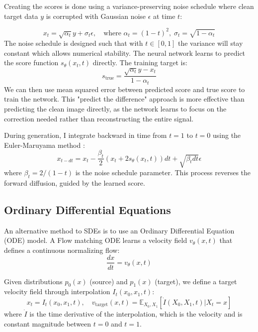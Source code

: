 \documentclass[conference,a4paper]{IEEEtran}
\begin{document}
Creating the scores is done using a variance-preserving noise schedule where clean target data $y$ is corrupted with Gaussian noise $\epsilon$ at time $t$:

\begin{equation}
    x_t = \sqrt{\alpha_t}y + \sigma_t\epsilon, \quad \text{where } \alpha_t = (1-t)^2, \; \sigma_t = \sqrt{1 - \alpha_t}
\end{equation}
The noise schedule is designed such that with $t \in [0, 1]$ the variance will stay constant which allows numerical stability. The neural network learns to predict the score function $s_\theta(x_t, t)$ directly. The training target is:
\begin{equation}
    s_{\text{true}} = \frac{\sqrt{\alpha_t}y - x_t}{1 - \alpha_t}
\end{equation}
We can then use mean squared error between predicted score and true score to train the network. This "predict the difference" approach is more effective than predicting the clean image directly, as the network learns to focus on the correction needed rather than reconstructing the entire signal.

During generation, I integrate backward in time from $t=1$ to $t=0$ using the Euler-Maruyama method \cite{burdenNumericalAnalysis2016}:
\begin{equation}
    x_{t-dt} = x_t - \frac{\beta_t}{2}(x_t + 2s_\theta(x_t, t))dt + \sqrt{\beta_t dt}\epsilon
\end{equation}
where $\beta_t = 2/(1-t)$ is the noise schedule parameter. This process reverses the forward diffusion, guided by the learned score.

\subsection{Ordinary Differential Equations}

An alternative method to SDEs is to use an Ordinary Differential Equation (ODE) model. A Flow matching ODE \cite{lipmanFlowMatchingGenerative2023} learns a velocity field $v_\theta(x, t)$ that defines a continuous normalizing flow:
\begin{equation}
    \frac{dx}{dt} = v_\theta(x, t)
\end{equation}

Given distributions $p_0(x)$ (source) and $p_1(x)$ (target), we define a target velocity field through interpolation $I_t(x_0, x_1, t)$:
\begin{equation}
    x_t = I_t(x_0, x_1, t), \quad v_{\text{target}}(x, t) = \mathbb{E}_{X_0, X_1}[\dot{I}(X_0, X_1, t) | X_t = x]
\end{equation}
where $\dot{I}$ is the time derivative of the interpolation, which is the velocity and is constant magnitude between $t=0$ and $t=1$. 
\end{document}
